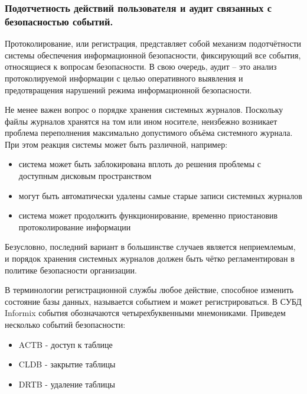 \subsubsection{Подотчетность действий пользователя и аудит связанных с безопасностью событий.}
Протоколирование, или регистрация, представляет собой механизм подотчётности системы обеспечения информационной безопасности, фиксирующий все события, относящиеся к вопросам безопасности. В свою очередь, аудит – это анализ протоколируемой информации с целью оперативного выявления и предотвращения нарушений режима информационной безопасности.

Не менее важен вопрос о порядке хранения системных журналов. Поскольку файлы журналов хранятся на том или ином носителе, неизбежно возникает проблема переполнения максимально допустимого объёма системного журнала. При этом реакция системы может быть различной, например:
\begin{itemize}
    \item система может быть заблокирована вплоть до решения проблемы с доступным дисковым пространством
    \item могут быть автоматически удалены самые старые записи системных журналов
    \item система может продолжить функционирование, временно приостановив протоколирование информации
\end{itemize}

Безусловно, последний вариант в большинстве случаев является неприемлемым, и порядок хранения системных журналов должен быть чётко регламентирован в политике безопасности организации.

В терминологии регистрационной службы любое действие, способное изменить состояние базы данных, называется событием и может регистрироваться. В СУБД Informix события обозначаются четырехбуквенными мнемониками. Приведем несколько событий безопасности:
\begin{itemize}
    \item ACTB - доступ к таблице
    \item CLDB - закрытие таблицы
    \item DRTB - удаление таблицы
\end{itemize}


